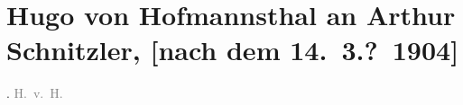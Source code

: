 

         \renewcommand{\erwaehnteWerke}{}
               \section[Hugo von Hofmannsthal an Arthur Schnitzler, {[}nach dem 14. 3.? 1904{]}]{ Hugo von Hofmannsthal an Arthur Schnitzler, {[}nach dem
               14. 3.? 1904{]}}\nopagebreak{}\rehead{ }\begin{ledgroupsized}[t]{13cm}\normalsize\beginnumbering \toendnotes[C]{\smallbreak\pagebreak[2]} \toendnotes[C]{\smallbreak}\pstart
           \noindent{}{\pb}\label{K_L01383_1v}\label{K_L01383_1h}.\pend
           \pstart \spacefill\mbox{\textcolor{gray}{H. v. H.}}\pend{}
         
         \endnumbering{}\end{ledgroupsized}  \newcommand{\dateiname}{L01383}\newcommand{\titel}{Hugo von Hofmannsthal an Arthur Schnitzler, [nach dem 14. 3.? 1904]}\newcommand{\editorInnen}{Martin Anton Müller und Gerd-Hermann Susen}
      